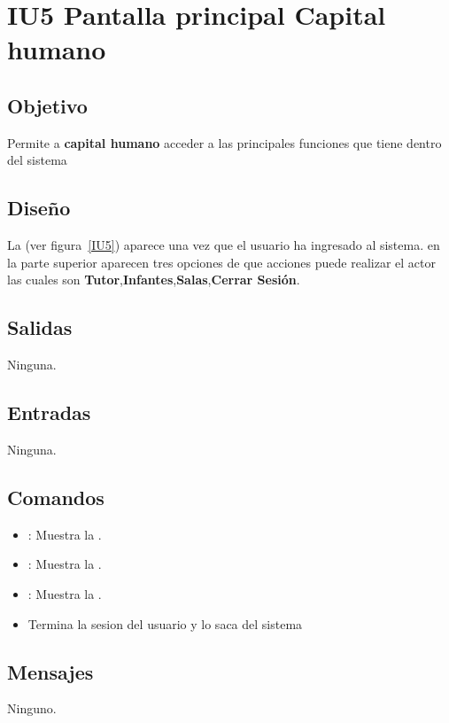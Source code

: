 \newpage
\section{IU5 Pantalla principal Capital humano}

\subsection{Objetivo}
	Permite a {\bf capital humano} acceder a las principales funciones que tiene dentro del sistema

\subsection{Diseño}
	La (ver figura~\ref{IU5}) aparece una vez que el usuario ha ingresado al sistema. 
 en la parte superior aparecen tres opciones de que acciones puede realizar el actor las cuales son {\bf Tutor},{\bf Infantes},{\bf Salas},{\bf Cerrar Sesión}. 

 

\subsection{Salidas}

	Ninguna.

\subsection{Entradas}
Ninguna.

\subsection{Comandos}
\begin{itemize}
	\item {}: Muestra la .
	\item {}: Muestra la .
 	\item {}: Muestra la .
        \item {}Termina la sesion del usuario y lo saca del sistema
\end{itemize}

\subsection{Mensajes}

\begin{Citemize}
	\item Ninguno.
\end{Citemize}

